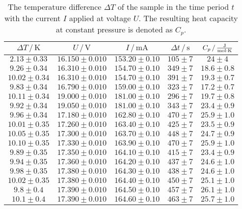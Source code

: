 \begin{table}
    \centering
    \caption{The temperature difference $\Delta T$ of the sample in the time period $t$ with the current $I$ applied at voltage $U$. The resulting heat capacity at constant pressure is denoted as $C_p$.}
    \label{tab:C_p}
    \begin{tabular}{c c c c c}
        \toprule
        $\Delta T \,/\, \unit{\kelvin}$ & $U \,/\, \unit{\volt}$ & $I \,/\, \unit{\milli\ampere}$ & $\Delta t \,/\, \unit{\second}$ & $C_p \,/\, \unit{\frac{\joule}{\mol \cdot \kelvin}}$ \\
        \midrule
        $2.13\pm0.33$ & $16.150\pm0.010$ & $153.20\pm0.10$ & $105\pm7$ & $24\pm4$ \\
        $9.26\pm0.34$ & $16.310\pm0.010$ & $154.70\pm0.10$ & $349\pm7$ & $18.6\pm0.8$ \\
        $10.02\pm0.34$ & $16.310\pm0.010$ & $154.70\pm0.10$ & $391\pm7$ & $19.3\pm0.7$ \\
        $9.83\pm0.34$ & $16.790\pm0.010$ & $159.00\pm0.10$ & $323\pm7$ & $17.2\pm0.7$ \\
        $10.11\pm0.34$ & $19.000\pm0.010$ & $181.00\pm0.10$ & $296\pm7$ & $19.7\pm0.8$ \\
        $9.92\pm0.34$ & $19.050\pm0.010$ & $181.00\pm0.10$ & $343\pm7$ & $23.4\pm0.9$ \\
        $9.96\pm0.34$ & $17.180\pm0.010$ & $162.80\pm0.10$ & $470\pm7$ & $25.9\pm1.0$ \\
        $10.01\pm0.35$ & $17.260\pm0.010$ & $163.40\pm0.10$ & $425\pm7$ & $23.5\pm0.9$ \\
        $10.05\pm0.35$ & $17.300\pm0.010$ & $163.70\pm0.10$ & $448\pm7$ & $24.7\pm0.9$ \\
        $10.10\pm0.35$ & $17.330\pm0.010$ & $163.90\pm0.10$ & $470\pm7$ & $25.9\pm1.0$ \\
        $9.89\pm0.35$ & $17.350\pm0.010$ & $164.10\pm0.10$ & $415\pm7$ & $23.4\pm0.9$ \\
        $9.94\pm0.35$ & $17.360\pm0.010$ & $164.20\pm0.10$ & $437\pm7$ & $24.6\pm1.0$ \\
        $9.98\pm0.35$ & $17.380\pm0.010$ & $164.30\pm0.10$ & $438\pm7$ & $24.6\pm1.0$ \\
        $10.02\pm0.35$ & $17.380\pm0.010$ & $164.40\pm0.10$ & $450\pm7$ & $25.1\pm1.0$ \\
        $9.8\pm0.4$ & $17.390\pm0.010$ & $164.50\pm0.10$ & $457\pm7$ & $26.1\pm1.0$ \\
        $10.1\pm0.4$ & $17.390\pm0.010$ & $164.60\pm0.10$ & $463\pm7$ & $25.7\pm1.0$ \\

\end{tabular}
\end{table}
